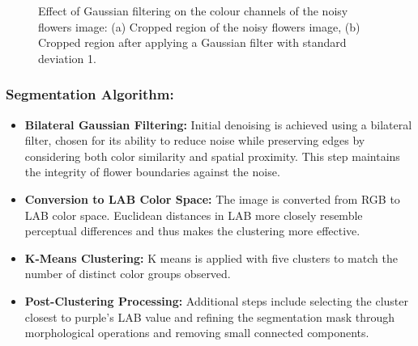\documentclass[11pt]{article}
\begin{document}
\begin{figure}[H]
\begin{subfigure}{.4\textwidth}
        \caption{}
        \label{fig:gaussian_filtered_flower_patch}
    \end{subfigure}%
    \caption{Effect of Gaussian filtering on the colour channels of the noisy flowers image: (a) Cropped region of the noisy flowers image, (b) Cropped region after applying a Gaussian filter with standard deviation 1.}
    \label{fig:gaussian_noise_evidence}
\end{figure}

\subsubsection{Segmentation Algorithm:}

\begin{itemize}
    \item \textbf{Bilateral Gaussian Filtering:} Initial denoising is achieved using a bilateral filter, chosen for its ability to reduce noise while preserving edges by considering both color similarity and spatial proximity. This step maintains the integrity of flower boundaries against the noise.
    
    \item \textbf{Conversion to LAB Color Space:} The image is converted from RGB to LAB color space. Euclidean distances in LAB more closely resemble perceptual differences and thus makes the clustering more effective.
    
    \item \textbf{K-Means Clustering:} K means is applied with five clusters to match the number of distinct color groups observed.
    
    \item \textbf{Post-Clustering Processing:} Additional steps include selecting the cluster closest to purple's LAB value and refining the segmentation mask through morphological operations and removing small connected components.
\end{itemize}
\end{document}
